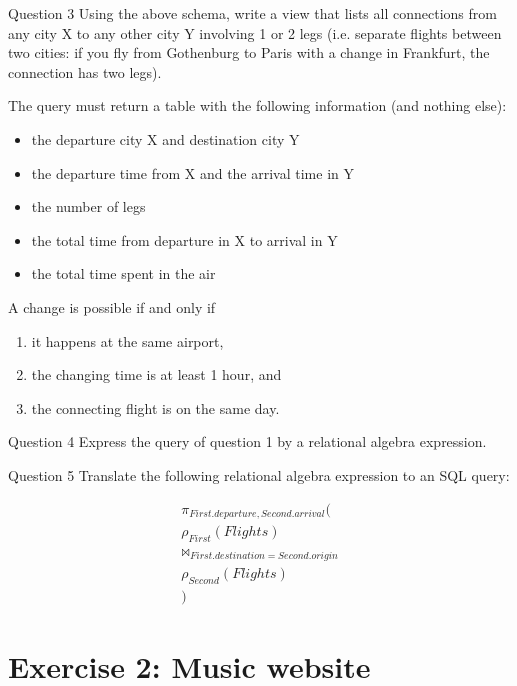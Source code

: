 \documentclass{beamer}
\begin{document}
\begin{frame}{Question 3}
Using the above schema, write a view that lists all connections from any city X
to any other city Y involving 1 or 2 legs (i.e. separate flights between two
cities: if you fly from Gothenburg to Paris with a change in Frankfurt, the
connection has two legs).

The query must return a table with the following information (and nothing
else):
\begin{itemize}
  \item the departure city X and destination city Y
  \item the departure time from X and the arrival time in Y
  \item the number of legs
  \item the total time from departure in X to arrival in Y
  \item the total time spent in the air
  \end{itemize}

A change is possible if and only if

\begin{enumerate}
  \item it happens at the same airport,
  \item the changing time is at least 1 hour, and
  \item the connecting flight is on the same day.
\end{enumerate}
\end{frame}

\begin{frame}{Question 4}
Express the query of question 1 by a relational algebra expression.
\end{frame}

\begin{frame}{Question 5}
Translate the following relational algebra expression to an SQL query:

\begin{multline}
  \pi_{First.departure,Second.arrival}( \\
    \rho_{First}(Flights) \\
    \bowtie_{First.destination = Second.origin} \\
    \rho_{Second}(Flights) \\
)
\end{multline}
\end{frame}

\section{Exercise 2: Music website}
\end{document}
